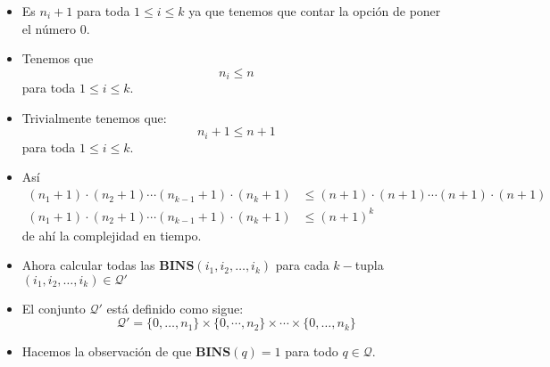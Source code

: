 \begin{frame}{\subsectiontitle}
    \begin{itemize}
        \item Es \(n_{i} + 1\) para toda \(1 \leq i \leq k\) ya que tenemos que contar la opción de poner el número \(0\).
        \item Tenemos que 
        \[
            n_{i} \leq n
        \]
        para toda \(1 \leq i \leq k\).
        \item Trivialmente tenemos que:
        \[
            n_{i} + 1 \leq n + 1
        \]
        para toda \(1 \leq i \leq k\).
        \item Así 
        \begin{align*}
            (n_{1} + 1) \cdot (n_{2} + 1) \dotsm (n_{k-1} + 1) \cdot (n_{k} + 1) &\leq (n + 1) \cdot (n + 1) \dotsm (n + 1) \cdot (n + 1) \\
            (n_{1} + 1) \cdot (n_{2} + 1) \dotsm (n_{k-1} + 1) \cdot (n_{k} + 1) &\leq (n + 1)^{k}
        \end{align*}
        de ahí la complejidad en tiempo.
    \end{itemize}

\end{frame}

\begin{frame}{\subsectiontitle}
    \begin{itemize}
        \item Ahora calcular todas las \(\mathbf{BINS}\left(i_{1}, i_{2}, \dotsc, i_{k}\right)\) para cada \(k-\)tupla
        \(\left(i_{1}, i_{2}, \dotsc, i_{k}\right) \in \mathcal{Q}'\) 
        \item El conjunto \(\mathcal{Q}'\) está 
        definido como sigue:
        \[
            \mathcal{Q}' = \{0, \dotsc, n_{1}\} \times \{0, \dotsm, n_{2}\}  \times \dotsm \times \{0, \dotsc, n_{k}\}  
        \]
        \item Hacemos la observación de que \(\mathbf{BINS}\left(q\right) = 1\) para todo \(q \in \mathcal{Q}\).
    \end{itemize}
\end{frame}

